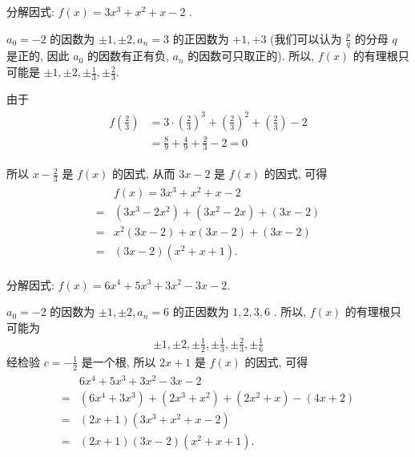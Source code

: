 \begin{example}
	分解因式: $f(x)=3 x^{3}+x^{2}+x-2$ . 
\end{example}
\begin{solution}
	$a_{0}=-2$ 的因数为 $\pm 1, \pm 2, a_{n}=3$ 的正因数为 $+1,+3$ (我们可以认为 $\frac{p}{q}$ 的分母 $q$ 是正的, 因此 $a_{0}$ 的因数有正有负, $a_{n}$ 的因数可只取正的). 所以,  $f(x)$ 的有理根只可能是 $\pm 1, \pm 2, \pm \frac{1}{3}, \pm \frac{2}{3}$.

	由于
	\begin{align*}
		\begin{aligned}
			f\left(\frac{2}{3}\right) & =3 \cdot\left(\frac{2}{3}\right)^{3}+\left(\frac{2}{3}\right)^{2}+\left(\frac{2}{3}\right)-2 \\
			                          & =\frac{8}{9}+\frac{4}{9}+\frac{2}{3}-2=0
		\end{aligned}
	\end{align*}

	所以 $x-\frac{2}{3}$ 是 $f(x)$ 的因式, 从而 $3 x-2$ 是 $f(x)$ 的因式, 可得
	\begin{align*}
		\begin{aligned}
			  & f(x)=3 x^{3}+x^{2}+x-2                                        \\
			= & \left(3 x^{3}-2 x^{2}\right)+\left(3 x^{2}-2 x\right)+(3 x-2) \\
			= & x^{2}(3 x-2)+x(3 x-2)+(3 x-2)                                 \\
			= & (3 x-2)\left(x^{2}+x+1\right) .
		\end{aligned}
	\end{align*}
\end{solution}

\begin{example}
	分解因式: $f(x)=6 x^{4}+5 x^{3}+3 x^{2}-3 x-2$.
\end{example}
\begin{solution}
	$a_{0}=-2$ 的因数为 $\pm 1, \pm 2, a_{n}=6$ 的正因数为 $1,2,3,6$ . 所以, $f(x)$ 的有理根只可能为
	\begin{align*}
		\pm 1, \pm 2, \pm \frac{1}{2}, \pm \frac{1}{3}, \pm \frac{2}{3}, \pm \frac{1}{6}
	\end{align*}
	经检验 $c=-\frac{1}{2}$ 是一个根, 所以 $2 x+1$ 是 $f(x)$ 的因式, 可得
	\begin{align*}
		\begin{aligned}
			  & 6 x^{4}+5 x^{3}+3 x^{2}-3 x-2                                                          \\
			= & \left(6 x^{4}+3 x^{3}\right)+\left(2 x^{3}+x^{2}\right)+\left(2 x^{2}+x\right)-(4 x+2) \\
			= & (2 x+1)\left(3 x^{3}+x^{2}+x-2\right)                                                  \\
			= & (2 x+1)(3 x-2)\left(x^{2}+x+1\right) .
		\end{aligned}
	\end{align*}
\end{solution}

